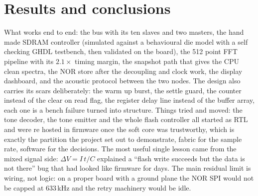 \documentclass[a4paper,10pt]{article}
\begin{document}
\section{Results and conclusions}

What works end to end: the bus with its ten slaves and two masters, the hand made
SDRAM controller (simulated against a behavioural die model with a self checking
GHDL testbench, then validated on the board), the 512 point FFT pipeline with its
$2.1\times$ timing margin, the snapshot path that gives the CPU clean spectra, the
NOR store after the decoupling and clock work, the display dashboard, and the acoustic
protocol between the two nodes. The design also carries its scars deliberately: the
warm up burst, the settle guard, the counter instead of the clear on read flag, the
register delay line instead of the buffer array, each one is a bench failure
turned into structure. Things tried and moved: the tone decoder, the tone emitter
and the whole flash controller all started as RTL and were re hosted in firmware
once the soft core was trustworthy, which is exactly the partition the project set
out to demonstrate, fabric for the sample rate, software for the decisions. The
most useful single lesson came from the mixed signal side: $\Delta V = I\,t/C$
explained a ``flash write succeeds but the data is not there'' bug that had looked
like firmware for days. The main residual limit is wiring, not logic: on a proper
board with a ground plane the NOR SPI would not be capped at 633\,kHz and the
retry machinery would be idle.
\end{document}

